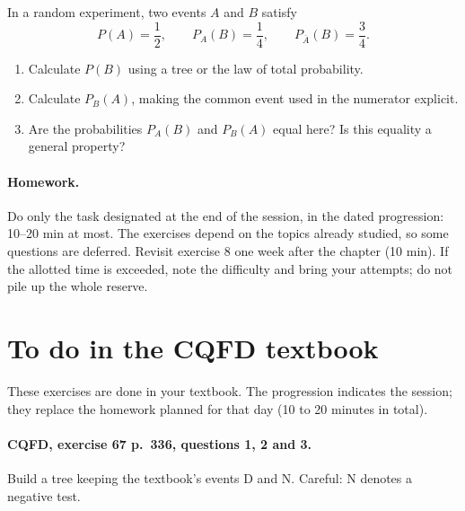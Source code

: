 In a random experiment, two events $A$ and $B$ satisfy\[P(A)=\dfrac12,\qquad P_A(B)=\dfrac14,\qquad P_{\overline A}(B)=\dfrac34.\]
\begin{enumerate}[label=\arabic*.]
\item Calculate $P(B)$ using a tree or the law of total probability.
\item Calculate $P_B(A)$, making the common event used in the numerator explicit.
\item Are the probabilities $P_A(B)$ and $P_B(A)$ equal here? Is this equality a general property?
\end{enumerate}
\paragraph{Homework.} Do only the task designated at the end of the session, in the dated progression: 10--20 min at most. The exercises depend on the topics already studied, so some questions are deferred. Revisit exercise 8 one week after the chapter (10 min). If the allotted time is exceeded, note the difficulty and bring your attempts; do not pile up the whole reserve.
\endgroup
{}\section*{To do in the CQFD textbook}
These exercises are done in your textbook. The progression indicates the session; they replace the homework planned for that day (10 to 20 minutes in total).
\paragraph{CQFD, exercise 67 p.~336, questions 1, 2 and 3.}\label{C05-M1} Build a tree keeping the textbook's events D and N. Careful: N denotes a negative test.

